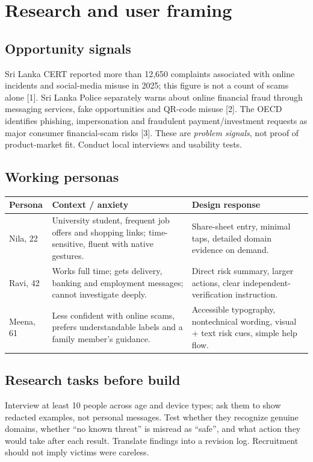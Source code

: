 \documentclass[10pt,a4paper]{article}
\begin{document}
\section{Research and user framing}
\subsection{Opportunity signals}
Sri Lanka CERT reported more than 12,650 complaints associated with online incidents and social-media misuse in 2025; this figure is not a count of scams alone [1]. Sri Lanka Police separately warns about online financial fraud through messaging services, fake opportunities and QR-code misuse [2]. The OECD identifies phishing, impersonation and fraudulent payment/investment requests as major consumer financial-scam risks [3]. These are \emph{problem signals}, not proof of product-market fit. Conduct local interviews and usability tests.

\subsection{Working personas}
\begin{tabularx}{\linewidth}{@{}p{29mm}Y Y@{}}\toprule
\textbf{Persona} & \textbf{Context / anxiety} & \textbf{Design response} \\ \midrule
Nila, 22 & University student, frequent job offers and shopping links; time-sensitive, fluent with native gestures. & Share-sheet entry, minimal taps, detailed domain evidence on demand. \\
Ravi, 42 & Works full time; gets delivery, banking and employment messages; cannot investigate deeply. & Direct risk summary, larger actions, clear independent-verification instruction. \\
Meena, 61 & Less confident with online scams, prefers understandable labels and a family member's guidance. & Accessible typography, nontechnical wording, visual + text risk cues, simple help flow. \\
\bottomrule\end{tabularx}

\subsection{Research tasks before build}
Interview at least 10 people across age and device types; ask them to show redacted examples, not personal messages. Test whether they recognize genuine domains, whether ``no known threat'' is misread as ``safe'', and what action they would take after each result. Translate findings into a revision log. Recruitment should not imply victims were careless.
\end{document}
